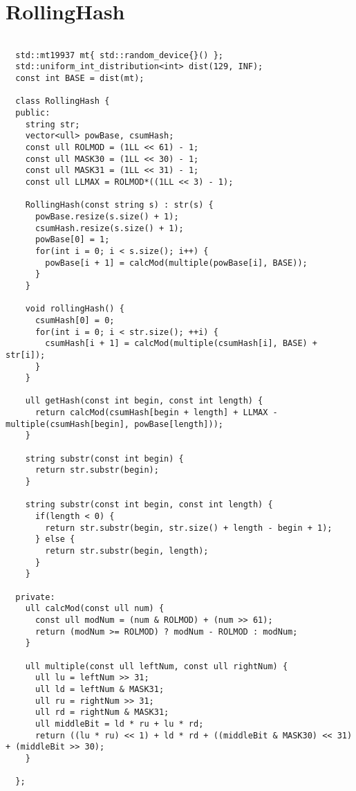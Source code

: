 \documentclass{jsarticle}
\begin{document}
\color{white}
\section{RollingHash}
\color{black}
\begin{lstlisting}[caption=RollingHash]

  std::mt19937 mt{ std::random_device{}() };
  std::uniform_int_distribution<int> dist(129, INF);
  const int BASE = dist(mt);
  
  class RollingHash {
  public:
    string str;
    vector<ull> powBase, csumHash;
    const ull ROLMOD = (1LL << 61) - 1;
    const ull MASK30 = (1LL << 30) - 1;
    const ull MASK31 = (1LL << 31) - 1;
    const ull LLMAX = ROLMOD*((1LL << 3) - 1);
  
    RollingHash(const string s) : str(s) {
      powBase.resize(s.size() + 1);
      csumHash.resize(s.size() + 1);
      powBase[0] = 1;
      for(int i = 0; i < s.size(); i++) {
        powBase[i + 1] = calcMod(multiple(powBase[i], BASE));
      }
    }
  
    void rollingHash() {
      csumHash[0] = 0;
      for(int i = 0; i < str.size(); ++i) {
        csumHash[i + 1] = calcMod(multiple(csumHash[i], BASE) + str[i]);
      }
    }
  
    ull getHash(const int begin, const int length) {
      return calcMod(csumHash[begin + length] + LLMAX - multiple(csumHash[begin], powBase[length]));
    }
  
    string substr(const int begin) {
      return str.substr(begin);
    }
  
    string substr(const int begin, const int length) {
      if(length < 0) {
        return str.substr(begin, str.size() + length - begin + 1);
      } else {
        return str.substr(begin, length);
      }
    }
  
  private:
    ull calcMod(const ull num) {
      const ull modNum = (num & ROLMOD) + (num >> 61);
      return (modNum >= ROLMOD) ? modNum - ROLMOD : modNum;
    }
  
    ull multiple(const ull leftNum, const ull rightNum) {
      ull lu = leftNum >> 31;
      ull ld = leftNum & MASK31;
      ull ru = rightNum >> 31;
      ull rd = rightNum & MASK31;
      ull middleBit = ld * ru + lu * rd;
      return ((lu * ru) << 1) + ld * rd + ((middleBit & MASK30) << 31) + (middleBit >> 30);
    }
  
  };
  

\end{lstlisting}
\end{document}
